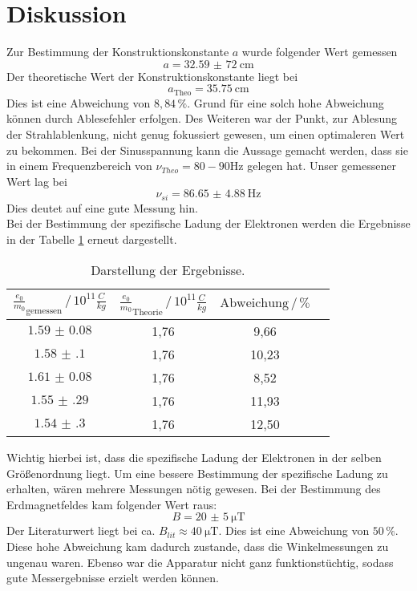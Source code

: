 \section{Diskussion}
Zur Bestimmung der Konstruktionskonstante $a$ wurde
folgender Wert gemessen
\begin{equation*}
    a = \SI{32,59(72)}{\centi\meter}
\end{equation*}
Der theoretische Wert der Konstruktionskonstante liegt bei
\begin{equation*}
   a_{\text{Theo}} = \SI{35.75}{\centi\meter}
\end{equation*}
Dies ist eine Abweichung von $8,84 \, \%$. Grund für eine solch hohe Abweichung
können durch Ablesefehler erfolgen. Des Weiteren war der Punkt, zur Ablesung der
Strahlablenkung, nicht genug fokussiert gewesen, um einen optimaleren Wert zu bekommen.
Bei der Sinusspannung kann die Aussage gemacht werden, dass sie in einem Frequenzbereich
von $\nu_{Theo}=80 - 90 \si{\hertz}$ gelegen hat.
Unser gemessener Wert lag bei
\begin{equation*}
  \nu_{si}= \SI{86.65(488)}{\hertz}
\end{equation*}
Dies deutet auf eine gute Messung hin.\\
Bei der Bestimmung der spezifische Ladung der Elektronen werden die Ergebnisse in der Tabelle \ref{tab:8}
erneut dargestellt.
\begin{table}[H]
  \centering
  \caption{Darstellung der Ergebnisse.}
  \label{tab:8}
  \begin{tabular}{c c c c}
\toprule
$\frac{e_0}{m_0}_{\text{gemessen}}\,/\, 10^{11}\frac{C}{kg}$ & $\frac{e_0}{m_0}_{\text{Theorie}} \,/\, 10^{11}\frac{C}{kg}$& $\text{Abweichung} \,/\, \%$\\
\midrule
$\num{1.59(8)}$ &1,76 &  9,66\\
$\num{1.58(10)}$&1,76 & 10,23\\
$\num{1.61(8)}$ &1,76 &  8,52\\
$\num{1.55(29)}$&1,76 & 11,93\\
$\num{1.54(30)}$&1,76 & 12,50\\
\bottomrule
  \end{tabular}
\end{table}
Wichtig hierbei ist, dass die spezifische Ladung der Elektronen in der selben Größenordnung liegt. Um eine bessere
Bestimmung der spezifische Ladung zu erhalten, wären mehrere Messungen nötig gewesen.
Bei der Bestimmung des Erdmagnetfeldes kam folgender Wert raus:
\begin{equation*}
  B= \SI{20(5)}{\micro\tesla}
\end{equation*}
Der Literaturwert \cite{3} liegt bei ca. $B_{lit} \approx \SI{40}{\micro\tesla}$.
Dies ist eine Abweichung von $50 \, \%$. Diese hohe Abweichung kam dadurch zustande, dass die Winkelmessungen
zu ungenau waren. Ebenso war die Apparatur nicht ganz funktionstüchtig, sodass gute Messergebnisse erzielt werden
können.
